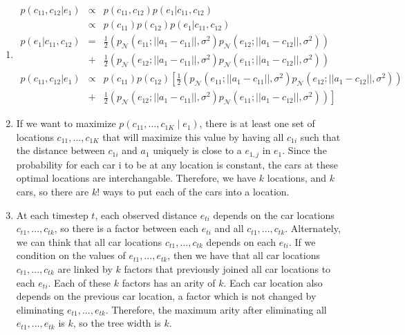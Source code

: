 \documentclass[12pt]{article}
\begin{document}
\begin{enumerate}[label=(\alph*)]
  \item 
  \begin{eqnarray*}
  p(c_{11}, c_{12} | e_1) &\propto& p(c_{11}, c_{12})p(e_1|c_{11}, c_{12})\\
  &\propto& p(c_{11})p(c_{12})p(e_1|c_{11}, c_{12})\\
  p(e_1|c_{11}, c_{12}) &=& \frac{1}{2}\left(p_{\mathcal N}(e_{11}; ||a_1 - c_{11}||, \sigma^2)p_{\mathcal N}(e_{12}; ||a_1 - c_{12}||, \sigma^2)\right) \\
  &+& \frac{1}{2}\left(p_{\mathcal N}(e_{12}; ||a_1 - c_{11}||, \sigma^2)p_{\mathcal N}(e_{11}; ||a_1 - c_{12}||, \sigma^2)\right)\\
  p(c_{11}, c_{12} | e_1) &\propto& p(c_{11})p(c_{12})\left[\frac{1}{2}\left(p_{\mathcal N}(e_{11}; ||a_1 - c_{11}||, \sigma^2)p_{\mathcal N}(e_{12}; ||a_1 - c_{12}||, \sigma^2)\right)\right. \\
  &+& \left.\frac{1}{2}\left(p_{\mathcal N}(e_{12}; ||a_1 - c_{11}||, \sigma^2)p_{\mathcal N}(e_{11}; ||a_1 - c_{12}||, \sigma^2)\right)\right]
  \end{eqnarray*}
  \item If we want to maximize $p(c_{11}, \dots, c_{1K} \mid e_1)$, there is at least one set of locations $c_{11}, \dots, c_{1K}$ that will maximize this value by having all $c_{1i}$ such that the distance between $c_{1i}$ and $a_1$ uniquely is close to a $e_{1,j}$ in $e_1$. Since the probability for each car i to be at any location is constant, the cars at these optimal locations are interchangable. Therefore, we have $k$ locations, and $k$ cars, so there are $k!$ ways to put each of the cars into a location.
  \item At each timestep $t$, each observed distance $e_{ti}$ depends on the car locations $c_{t1}, ..., c_{tk}$, so there is a factor between each $e_{ti}$ and all $c_{t1}, ..., c_{tk}$. Alternately, we can think that all car locations $c_{t1}, ..., c_{tk}$ depends on each $e_{ti}$. If we condition on the values of $e_{t1}, ..., e_{tk}$, then we have that all car locations $c_{t1}, ..., c_{tk}$ are linked by $k$ factors that previously joined all car locations to each $e_{ti}$. Each of these $k$ factors has an arity of $k$. Each car location also depends on the previous car location, a factor which is not changed by eliminating $e_{t1}, ..., e_{tk}$. Therefore, the maximum arity after eliminating all $e_{t1}, ..., e_{tk}$ is $k$, so the tree width is $k$.
  \end{enumerate}
\end{document}
